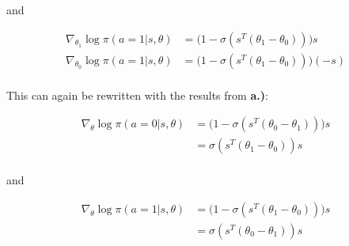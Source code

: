 \documentclass[11pt,a4paper]{article}
\begin{document}
and 

\begin{align*}
  \nabla_{\theta_{1}} \log \pi(a=1|s,\theta) &=  \bigl( 1 -  \sigma(s^{T}(\theta_{1} - \theta_{0})) \bigr)s \\
  \nabla_{\theta_{0}} \log \pi(a=1|s,\theta) &=  \bigl( 1 -  \sigma(s^{T}(\theta_{1} - \theta_{0})) \bigr)(-s) \\
\end{align*}

This can again be rewritten with the results from \textbf{a.)}:


\begin{align*}
  \nabla_{\theta} \log \pi(a=0|s,\theta) &=  \bigl( 1 -  \sigma(s^{T}(\theta_{0} - \theta_{1})) \bigr)s \\
                                         &= \sigma(s^{T}(\theta_{1} - \theta_{0}))s \\
\end{align*}

and

\begin{align*}
  \nabla_{\theta} \log \pi(a=1|s,\theta) &=  \bigl( 1 -  \sigma(s^{T}(\theta_{1} - \theta_{0})) \bigr)s \\
                                         &= \sigma(s^{T}(\theta_{0} - \theta_{1}))s \\
\end{align*}
\end{document}
